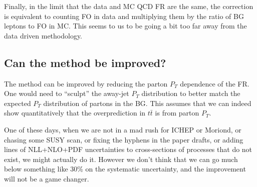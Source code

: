 Finally, in the limit that the data and MC QCD FR are the same, the 
correction is equivalent to counting FO in data and 
multiplying them by the ratio of BG leptons to FO in MC.
This seems to us to be going a bit too far away from 
the data driven methodology.  

\subsection{Can the method be improved?}
\label{sec:frimprove}

The method can be improved by reducing the parton $P_T$ dependence
of the FR.  One would need to ``sculpt'' the away-jet $P_T$ 
distribution to better match the expected $P_T$ distribution
of partons in the BG.  This assumes that we can indeed show 
quantitatively that the overprediction in $t\bar{t}$ is from
parton $P_T$.

One of these days, when we are not in a mad rush for ICHEP or Moriond,
or chasing some SUSY scan, or fixing the hyphens in the 
paper drafts, or adding lines of NLL+NLO+PDF uncertainties
to cross-sections of processes that do not exist,
we might actually do it.  However we don't think
that we can go much below something like 30\% on the systematic 
uncertainty, and the improvement will not be a game changer.







